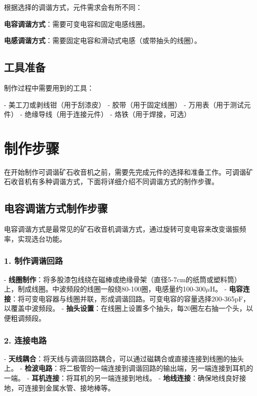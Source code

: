 \documentclass[12pt,UTF8]{ctexbook}
\begin{document}
根据选择的调谐方式，元件需求会有所不同：

\textbf{电容调谐方式}：需要可变电容和固定电感线圈。

\textbf{电感调谐方式}：需要固定电容和滑动式电感（或带抽头的线圈）。

\subsection{工具准备}

制作过程中需要用到的工具：

- 美工刀或剥线钳（用于刮漆皮）
- 胶带（用于固定线圈）
- 万用表（用于测试元件）
- 绝缘导线（用于连接元件）
- 烙铁（用于焊接，可选）

\section{制作步骤}

在开始制作可调谐矿石收音机之前，需要先完成元件的选择和准备工作。可调谐矿石收音机有多种调谐方式，下面将详细介绍不同调谐方式的制作步骤。

\subsection{电容调谐方式制作步骤}

电容调谐方式是最常见的矿石收音机调谐方式，通过旋转可变电容来改变谐振频率，实现选台功能。

\subsubsection{1. 制作调谐回路}

- \textbf{线圈制作}：将多股漆包线绕在磁棒或绝缘骨架（直径5-7cm的纸筒或塑料筒）上，制成线圈。中波频段的线圈一般绕80-100圈，电感量约100-300$\mu$H。
- \textbf{电容连接}：将可变电容器与线圈并联，形成调谐回路。可变电容的容量选择200-365pF，以覆盖中波频段。
- \textbf{抽头设置}：在线圈上设置多个抽头，每20圈左右抽一个头，以便粗调频段。

\subsubsection{2. 连接电路}

- \textbf{天线耦合}：将天线与调谐回路耦合，可以通过磁耦合或直接连接到线圈的抽头上。
- \textbf{检波电路}：将二极管的一端连接到调谐回路的输出端，另一端连接到耳机的一端。
- \textbf{耳机连接}：将耳机的另一端连接到地线。
- \textbf{地线连接}：确保地线良好接地，可连接到金属水管、接地棒等。
\end{document}
